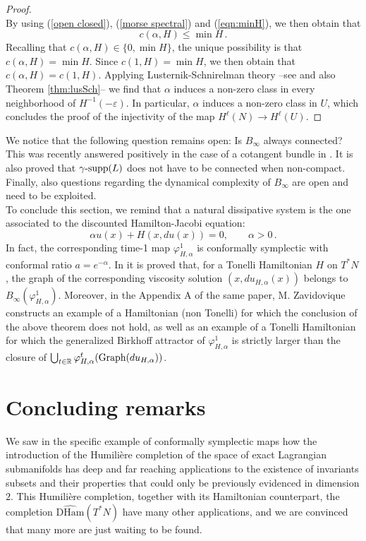 \documentclass{article}
\newcommand{\1}{\mathbbm{1}}
\theoremstyle{remark}
\begin{document}
\begin{proof}
\begin{equation}
\end{equation}
By using (\ref{open closed}), (\ref{morse spectral}) and (\ref{eqn:minH}), we then obtain that
$$c(\alpha,H) \le \min H\, .$$
Recalling that $c(\alpha,H) \in \{0,\min H\}$, the unique possibility is that $c(\alpha,H) = \min H$. Since $c(1,H) = \min H$, we then obtain that $c(\alpha,H) = c(1,H)$. Applying Lusternik-Schnirelman theory --see \cite[Lemma 6.1]{arnHumVit24} and also Theorem \ref{thm:lusSch}-- we find that $\alpha$ induces a non-zero class in every neighborhood of $H^{-1}(-\varepsilon)$. In particular, $\alpha$ induces a non-zero class in $U$, which concludes the proof of the injectivity of the map $H^{\ell}(N) \to H^{\ell}(U)$.
\end{proof}
\noindent We notice that the following question remains open: Is $B_{\infty}$ always connected? This was recently answered positively in the case of a cotangent bundle in \cite{AGIV24}. It is also proved that $\gamma\textnormal{-supp}(L)$ does not have to be connected when non-compact. Finally, also questions regarding the dynamical complexity of $B_{\infty}$ are open and need to be exploited. \\
\indent To conclude this section, we remind that a natural dissipative system is the one associated to the discounted Hamilton-Jacobi equation:
$$\alpha u(x) + H(x,du(x)) = 0, \qquad \alpha > 0\, .$$
In fact, the corresponding time-1 map $\varphi^1_{H,\alpha}$ is conformally symplectic with conformal ratio $a = e^{-\alpha}$. In \cite[Theorem 1.5]{arnHumVit24} it is proved that, for a Tonelli Hamiltonian $H$ on $T^*N$, the graph of the corresponding viscosity solution $(x,du_{H,\alpha}(x))$ belongs to $B_{\infty}(\varphi^1_{H,\alpha})$. Moreover, in the Appendix A of the same paper, M. Zavidovique constructs an example of a Hamiltonian (non Tonelli) for which the conclusion of the above theorem does not hold, as well as an example of a
Tonelli Hamiltonian for which the generalized Birkhoff attractor of $\varphi^1_{H,\alpha}$ is strictly larger than the closure of $\bigcup_{t \in \mathbb{R}} \varphi^t_{H,\alpha} (\textnormal{Graph}(du_{H,\alpha}))$.

\section{Concluding remarks}
We saw in the specific example of conformally symplectic maps how the introduction of the Humilière completion of the space of exact Lagrangian submanifolds has deep and far reaching applications to the existence of invariants subsets and their properties that could only be previously evidenced in dimension $2$. This Humilière completion, together with its Hamiltonian counterpart, the completion $\widehat{\mathrm{DHam}}(T^*N)$ have many other applications, and we are convinced that many more are just waiting to be found. 
\end{document}

